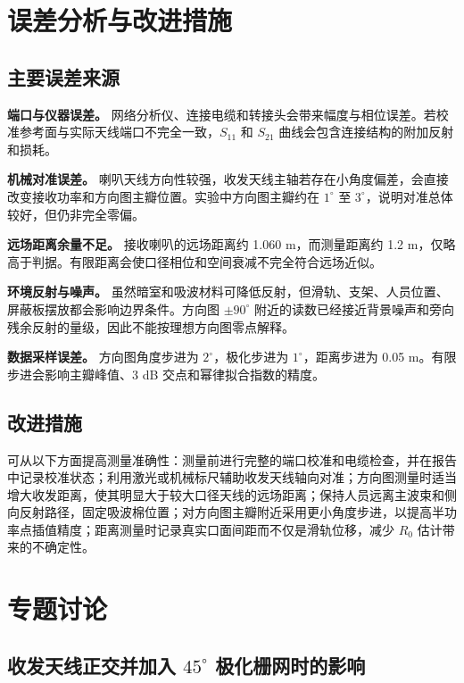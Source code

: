 \documentclass{ctexart}
\begin{document}
\section{误差分析与改进措施}

\subsection{主要误差来源}

\textbf{端口与仪器误差。} 网络分析仪、连接电缆和转接头会带来幅度与相位误差。若校准参考面与实际天线端口不完全一致，$S_{11}$ 和 $S_{21}$ 曲线会包含连接结构的附加反射和损耗。

\textbf{机械对准误差。} 喇叭天线方向性较强，收发天线主轴若存在小角度偏差，会直接改变接收功率和方向图主瓣位置。实验中方向图主瓣约在 $1^\circ$ 至 $3^\circ$，说明对准总体较好，但仍非完全零偏。

\textbf{远场距离余量不足。} 接收喇叭的远场距离约 1.060 m，而测量距离约 1.2 m，仅略高于判据。有限距离会使口径相位和空间衰减不完全符合远场近似。

\textbf{环境反射与噪声。} 虽然暗室和吸波材料可降低反射，但滑轨、支架、人员位置、屏蔽板摆放都会影响边界条件。方向图 $\pm90^\circ$ 附近的读数已经接近背景噪声和旁向残余反射的量级，因此不能按理想方向图零点解释。

\textbf{数据采样误差。} 方向图角度步进为 $2^\circ$，极化步进为 $1^\circ$，距离步进为 0.05 m。有限步进会影响主瓣峰值、3 dB 交点和幂律拟合指数的精度。

\subsection{改进措施}

可从以下方面提高测量准确性：测量前进行完整的端口校准和电缆检查，并在报告中记录校准状态；利用激光或机械标尺辅助收发天线轴向对准；方向图测量时适当增大收发距离，使其明显大于较大口径天线的远场距离；保持人员远离主波束和侧向反射路径，固定吸波棉位置；对方向图主瓣附近采用更小角度步进，以提高半功率点插值精度；距离测量时记录真实口面间距而不仅是滑轨位移，减少 $R_0$ 估计带来的不确定性。

\section{专题讨论}

\subsection{收发天线正交并加入 $45^\circ$ 极化栅网时的影响}
\end{document}
